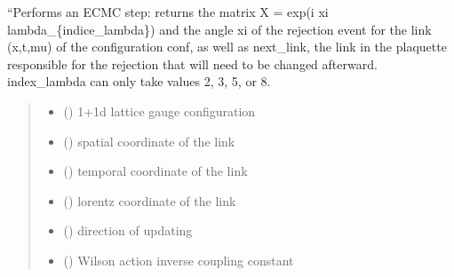 \documentclass[letterpaper,10pt,english]{sphinxmanual}
\begin{document}
\begin{fulllineitems}
\label{\detokenize{ECMC:ECMC.ECMC_step}}
\pysigstartsignatures
\pysiglinewithargsret
{}
{\sphinxparamcomma {}\sphinxparamcomma {}\sphinxparamcomma {}\sphinxparamcomma {}\sphinxparamcomma {}}
{}
\pysigstopsignatures
\sphinxAtStartPar
“Performs an ECMC step: returns the matrix X = exp(i xi lambda\_\{indice\_lambda\}) and the angle xi of the rejection event for the link (x,t,mu) of the configuration conf, as well as next\_link, the link in the plaquette responsible for the rejection that will need to be changed afterward. index\_lambda can only take values 2, 3, 5, or 8.
\begin{quote}\begin{description}
\begin{itemize}
\item {} 
\sphinxAtStartPar
{} () \textendash{} 1+1d lattice gauge configuration

\item {} 
\sphinxAtStartPar
{} () \textendash{} spatial coordinate of the link

\item {} 
\sphinxAtStartPar
{} () \textendash{} temporal coordinate of the link

\item {} 
\sphinxAtStartPar
{} () \textendash{} lorentz coordinate of the link

\item {} 
\sphinxAtStartPar
{} () \textendash{} direction of updating

\item {} 
\sphinxAtStartPar
{} () \textendash{} Wilson action inverse coupling constant


\end{itemize}
\end{description}
\end{quote}
\end{fulllineitems}
\end{document}
